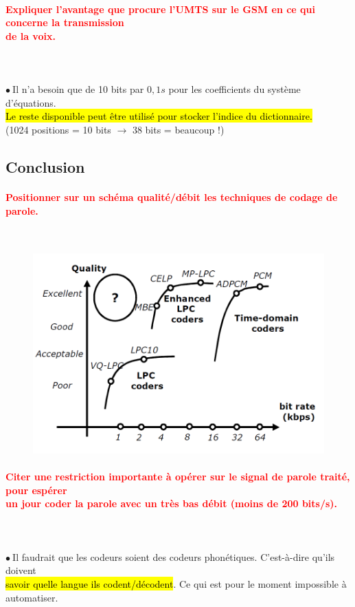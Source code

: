 \documentclass[letterpaper, 12pt]{article}
\newcommand{\alinea}{
\hspace*{0.3cm}}
\newcommand{\red}[1]{
	\textcolor{red}{#1}
}
\newcommand{\point}{$\bullet\ $}
\begin{document}
		\paragraph{\red{Expliquer l'avantage que procure l'UMTS sur le GSM en ce qui concerne la transmission 
		~\\ \hspace*{0.035cm} de la voix.}}~\\~\\
			\point Il n'a besoin que de 10 bits par $0,1s$ pour les coefficients du système d'équations.
				\\\alinea \hl{Le reste disponible peut \^etre utilis\'e pour stocker l'indice du dictionnaire.}
				\\\alinea (1024 positions = 10 bits $\rightarrow$ 38 bits = beaucoup !) 
	\subsection{Conclusion}
		\paragraph{\red{Positionner sur un schéma qualité/débit les techniques de codage de parole.}}~\\
			\begin{figure}[H]
				\centering
				\includegraphics[scale=0.375]{Images/quality}
			\end{figure}\noindent
		\paragraph{\red{Citer une restriction importante à opérer sur le signal de parole traité, pour espérer 
		~\\ \hspace*{0.035cm} un jour coder la parole avec un très bas débit (moins de 200 bits/s).}}~\\~\\
			\point Il faudrait que les codeurs soient des codeurs phonétiques. C'est-\`a-dire qu'ils doivent
				\\\alinea \hl{savoir quelle langue ils codent/d\'ecodent}. Ce qui est pour le moment impossible à
				\\\alinea automatiser.
			
\end{document}
